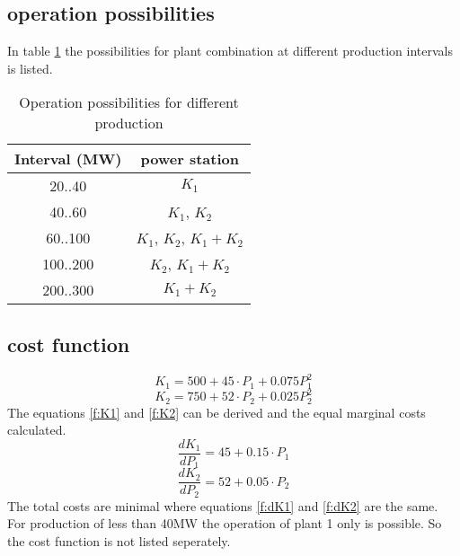 \documentclass{article}
\begin{document}
	\subsection{operation possibilities}
In table \ref{tab:oppos} the possibilities for plant combination at different production intervals is listed.
	\begin{table}
\begin{center}
\begin{tabular}{|c|c|}
\hline 
Interval (MW) & power station\\ \hline
20..40 & $K_1$\\
40..60 & $K_1$, $K_2$\\
60..100 & $K_1$, $K_2$, $K_1+K_2$\\
100..200 & $K_2$, $K_1+K_2$\\
200..300 & $K_1+K_2$\\
\hline
\end{tabular}
\caption{Operation possibilities for different production}\label{tab:oppos}
\end{center}
\end{table}

\subsection{cost function}
	\begin{equation}
		K_1=500+45\cdot P_1 + 0.075 P_1^2
		\label{f:K1}
	\end{equation}
	\begin{equation}
		K_2=750+52\cdot P_2 + 0.025 P_2^2
		\label{f:K2}
	\end{equation}
The equations \ref{f:K1} and \ref{f:K2} can be derived and the equal marginal costs calculated.
	\begin{equation}
		\frac{dK_1}{dP_1}=45+0.15\cdot P_1
		\label{f:dK1}
	\end{equation}
	\begin{equation}
		\frac{dK_2}{dP_2}=52+0.05\cdot P_2
		\label{f:dK2}
	\end{equation}
	The total costs are minimal where equations \ref{f:dK1} and \ref{f:dK2} are the same. For production of less than 40MW the operation of plant 1 only is possible. So the cost function is not listed seperately.
\end{document}
